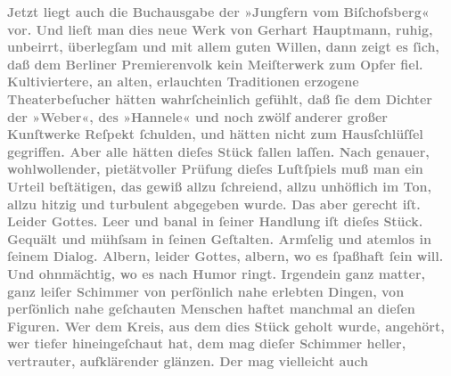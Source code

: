 \begin{ledgroupsized}[t]{13cm}
           \pstart
           \noindent{}\textcolor{gray}{\textbf{Jetzt liegt auch die Buchausgabe der »Jungfern vom Biſchofsberg« vor. Und lieſt man dies neue
                  Werk von Gerhart Hauptmann, ruhig,
                  unbeirrt, überlegſam und mit allem guten Willen, dann zeigt es ſich, daß dem Berliner Premierenvolk kein Meiſterwerk zum
                  Opfer fiel. Kultiviertere, an alten, erlauchten Traditionen erzogene
                  Theaterbeſucher hätten wahrſcheinlich gefühlt, daß ſie dem Dichter der »Weber«, des »Hannele« und noch zwölf anderer großer Kunſtwerke Reſpekt ſchulden, und
                  hätten nicht zum Hausſchlüſſel gegriffen. Aber alle hätten dieſes Stück fallen
                  laſſen. Nach genauer, wohlwollender, pietätvoller Prüfung dieſes Luſtſpiels muß
                  man ein Urteil beſtätigen, das gewiß allzu ſchreiend, allzu unhöflich im Ton,
                  allzu hitzig und turbulent abgegeben wurde. Das aber gerecht iſt. Leider Gottes.
                  Leer und banal in ſeiner Handlung iſt dieſes Stück. Gequält und mühſsam in ſeinen
                  Geſtalten. Armſelig und atemlos in ſeinem Dialog. Albern, leider Gottes, albern,
                  wo es ſpaßhaft ſein will. Und ohnmächtig, wo es nach Humor ringt. Irgendein ganz
                  matter, ganz leiſer Schimmer von perſönlich nahe erlebten Dingen, von perſönlich
                  nahe geſchauten Menschen haftet manchmal an dieſen Figuren. Wer dem Kreis, aus dem
                  dies Stück geholt wurde, angehört, wer tiefer hineingeſchaut hat, dem mag dieſer
                  Schimmer heller, vertrauter, aufklärender glänzen. Der mag vielleicht auch
}}
\end{ledgroupsized}
